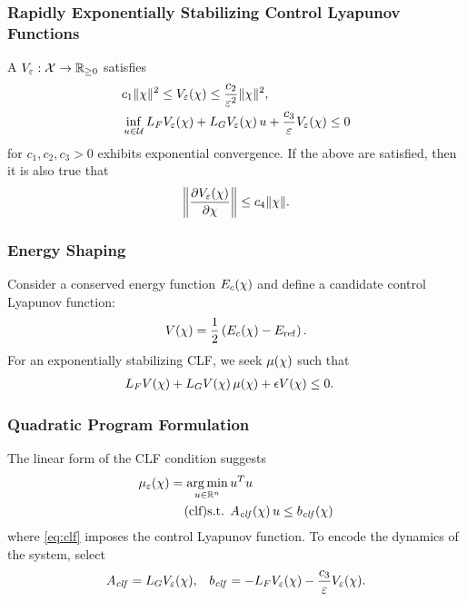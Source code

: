 \begin{frame}[t]
  \frametitle{Rapidly Exponentially Stabilizing Control Lyapunov Functions}
  A 
  $V_{\varepsilon} : \mathcal{X} \to \mathbb{R}_{\geq 0}$ satisfies
  \begin{align*}
    &c_{1} \|\chi\|^{2} \leq V_{\varepsilon}(\chi) \leq \frac{c_{2}}{\varepsilon^{2}} \|\chi\|^{2},\\
    &\inf_{u \in \mathcal{U}} L_{F}V_{\varepsilon}(\chi) + L_{G}V_{\varepsilon}(\chi) \, u +
    \frac{c_{3}}{\varepsilon} V_{\varepsilon}(\chi) \leq 0
  \end{align*}
  for $c_{1}, c_{2}, c_{3} > 0$ exhibits exponential convergence. If the above
  are satisfied, then it is also true that
  \begin{align*}
    \left\| \frac{\partial{V_{\varepsilon}(\chi)}}{\partial{\chi}} \right\| \leq c_{4} \|\chi\|.
  \end{align*}
\end{frame}

\begin{frame}[t]
  \frametitle{Energy Shaping}
  Consider a conserved energy function $E_{c}(\chi)$ and define a candidate
  control Lyapunov function:
  \begin{align*}
    V(\chi) = \frac{1}{2} \left(E_{c}(\chi) - E_{\mathrm{ref}}\right).
  \end{align*}
  For an exponentially stabilizing CLF, we seek $\mu(\chi)$ such that
  \begin{align*}
    L_{F} V(\chi) + L_{G} V(\chi) \, \mu(\chi) + \epsilon V(\chi) &\leq 0.
  \end{align*}
\end{frame}

\begin{frame}[t]
  \frametitle{Quadratic Program Formulation}
  The linear form of the CLF condition suggests
  \begin{align}
    \nonumber
    \mueps\arx = \argmin_{\uu \in \R^{n}}  \, & \uu^T \uu\\
    \label{eq:clf} \tag{clf}
    \mbox{s.t. } & \Aclf\arx \, \uu \leq \bclf\arx%
  \end{align}
  where \eqref{eq:clf} imposes the control Lyapunov function. To encode the dynamics of the system, select
  \begin{align*}
    A_{\mathit{clf}} = L_{G}V_{\varepsilon}(\chi), && b_{\mathit{clf}} = -L_{F}V_{\varepsilon}(\chi) - \frac{c_{3}}{\varepsilon} V_{\varepsilon}(\chi).
  \end{align*}
\end{frame}

